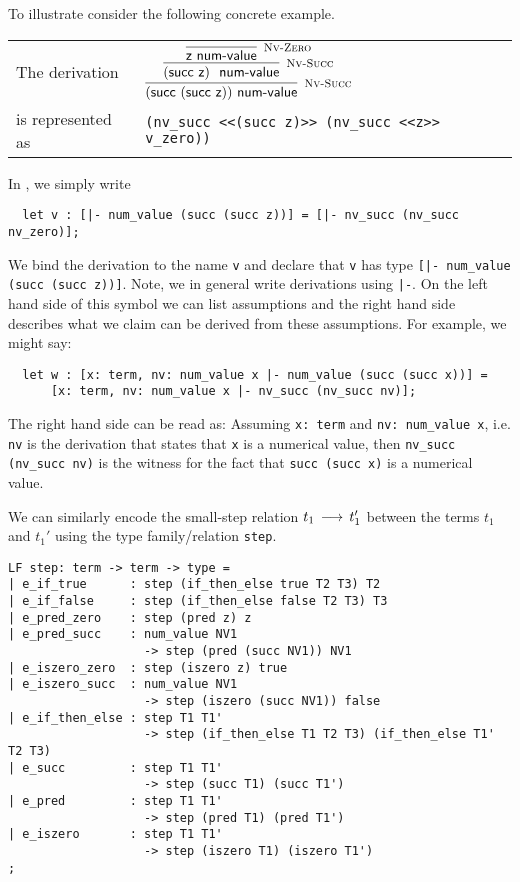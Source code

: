 To illustrate consider the following concrete example.\\[1em]

\begin{tabular}{l@{\qquad}l}
The derivation &
$
\infer[\NVSucc]
  { (\tmsucc (\tmsucc \tmzero)) \NumValue }
  { \infer[\NVSucc]
      { (\tmsucc \tmzero)~\NumValue }
      { \infer[\NVZero]
          {\tmzero \NumValue}
          {}
      }
  }
$\\[1em]
is represented as &
\lstinline!(nv_succ <<(succ z)>> (nv_succ <<z>> v_zero))!\\[1em]
\end{tabular}

In \beluga, we simply write
\begin{lstlisting}
  let v : [|- num_value (succ (succ z))] = [|- nv_succ (nv_succ nv_zero)];
\end{lstlisting}

We bind the derivation to the name \lstinline!v!  and declare that \lstinline!v!
has type \lstinline![|- num_value (succ (succ z))]!.  Note,  we in general write
derivations using \lstinline!|-!.  On the left hand side  of this symbol  we can
list assumptions and the right hand side describes  what we claim can be derived
from these assumptions.  For example, we might say:

\begin{lstlisting}
  let w : [x: term, nv: num_value x |- num_value (succ (succ x))] =
      [x: term, nv: num_value x |- nv_succ (nv_succ nv)];
\end{lstlisting}

The  right  hand  side   can  be  read  as:   Assuming  \lstinline!x: term!  and
\lstinline!nv: num_value x!,  i.e. \lstinline!nv!  is the derivation that states
that \lstinline!x! is  a numerical value,  then \lstinline!nv_succ (nv_succ nv)!
is the witness for the fact that \lstinline!succ (succ x)! is a numerical value.

We can similarly  encode the small-step relation  $t_1 \mathrel{\,\longrightarrow\,} t_1'$  between the
terms $t_1$ and $t_1'$ using the type family/relation \lstinline!step!.

\begin{lstlisting}
LF step: term -> term -> type =
| e_if_true      : step (if_then_else true T2 T3) T2
| e_if_false     : step (if_then_else false T2 T3) T3
| e_pred_zero    : step (pred z) z
| e_pred_succ    : num_value NV1
                   -> step (pred (succ NV1)) NV1
| e_iszero_zero  : step (iszero z) true
| e_iszero_succ  : num_value NV1
                   -> step (iszero (succ NV1)) false
| e_if_then_else : step T1 T1'
                   -> step (if_then_else T1 T2 T3) (if_then_else T1' T2 T3)
| e_succ         : step T1 T1'
                   -> step (succ T1) (succ T1')
| e_pred         : step T1 T1'
                   -> step (pred T1) (pred T1')
| e_iszero       : step T1 T1'
                   -> step (iszero T1) (iszero T1')
;
\end{lstlisting}

